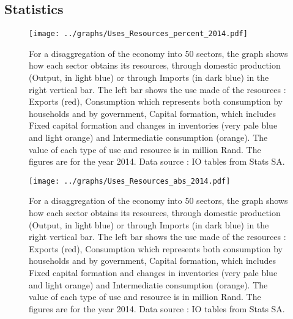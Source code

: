 \documentclass[12pt,english]{article}
\begin{document}
\subsection{Statistics}

\begin{landscape}
	\thispagestyle{empty}
	\begin{figure}[!ht]
		\vspace{-30pt}\hspace{-36pt}\texttt{[image: ../graphs/Uses\_Resources\_percent\_2014.pdf]}
		\caption{\label{Uses_Resources_percent_2014}For a disaggregation of the economy into 50 sectors, the graph shows how each sector obtains its resources, through domestic production (Output, in light blue) or through Imports (in dark blue) in the right vertical bar. The left bar shows the use made of the resources : Exports (red), Consumption which represents both consumption by households and by government, Capital formation, which includes Fixed capital formation and changes in inventories (very pale blue and light orange) and Intermediatie consumption (orange). The value of each type of use and resource is in million Rand. The figures are for the year 2014. Data source : IO tables from Stats SA.}
	\end{figure}	
\end{landscape}


\begin{landscape}
	\thispagestyle{empty}
	\begin{figure}[!ht]
		\vspace{-30pt}\hspace{-36pt}\texttt{[image: ../graphs/Uses\_Resources\_abs\_2014.pdf]}
		\caption{\label{Uses_Resources_abs_2014}For a disaggregation of the economy into 50 sectors, the graph shows how each sector obtains its resources, through domestic production (Output, in light blue) or through Imports (in dark blue) in the right vertical bar. The left bar shows the use made of the resources : Exports (red), Consumption which represents both consumption by households and by government, Capital formation, which includes Fixed capital formation and changes in inventories (very pale blue and light orange) and Intermediatie consumption (orange). The value of each type of use and resource is in million Rand. The figures are for the year 2014. Data source : IO tables from Stats SA.}
	\end{figure}	
\end{landscape}
\end{document}
